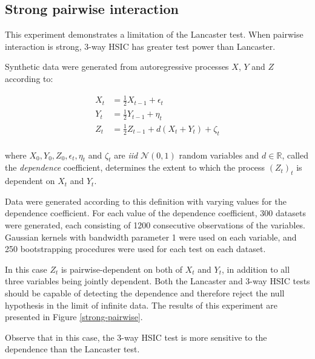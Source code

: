 \documentclass[]{article}
\begin{document}
\subsection{Strong pairwise interaction}\label{experiment3}
This experiment demonstrates a limitation of the Lancaster test. When pairwise interaction is strong, 3-way HSIC has greater test power than Lancaster.

Synthetic data were generated from autoregressive processes $X$, $Y$ and $Z$ according to:

\begin{align*}
X_t &= \frac{1}{2}X_{t-1} + \epsilon_t\\
Y_t &= \frac{1}{2}Y_{t-1} + \eta_t\\
Z_t &= \frac{1}{2}Z_{t-1} + d(X_t + Y_t) + \zeta_t\\
\end{align*}

where $X_0, Y_0, Z_0, \epsilon_t, \eta_t$ and $\zeta_t$ are \emph{iid} $\mathcal{N}(0,1)$ random variables and $d\in\mathbb{R}$, called the \emph{dependence} coefficient, determines the extent to which the process $(Z_t)_t$ is dependent on $X_t$ and $Y_t$.

Data were generated according to this definition with varying values for the dependence coefficient. For each value of the dependence coefficient, 300 datasets were generated, each consisting of 1200 consecutive observations of the variables. Gaussian kernels with bandwidth parameter 1 were used on each variable, and 250 bootstrapping procedures were used for each test on each dataset.

In this case $Z_t$ is pairwise-dependent on both of $X_t$ and $Y_t$, in addition to all three variables being jointly dependent. Both the Lancaster and 3-way HSIC tests should be capable of detecting the dependence and therefore reject the null hypothesis in the limit of infinite data. The results of this experiment are presented in Figure \ref{strong-pairwise}. 

Observe that in this case, the 3-way HSIC test is more sensitive to the dependence than the Lancaster test.
\end{document}
